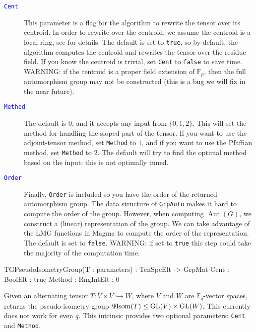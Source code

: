 \documentclass{documentation}
\DeclareMathOperator{\Aut}{Aut}
\DeclareMathOperator{\isom}{Isom}
\DeclareMathOperator{\GL}{{\rm GL}}
\newcommand{\pseudo}{\Psi\hspace*{-1mm}\isom}
\begin{document}
\begin{description}
\item[\textcolor{blue}{\tt Cent}]
This parameter is a flag for the algorithm to rewrite the tensor over its centroid. 
In order to rewrite over the centroid, we assume the centroid is a local ring, see \cite{eMAGma} for details.
The default is set to {\tt true}, so by default, the algorithm computes the centroid and rewrites the tensor over the residue field.
If you know the centroid is trivial, set {\tt Cent} to {\tt false} to save time.
WARNING: if the centroid is a proper field extension of $\mathbb{F}_p$, then the full automorphism group may not be constructed (this is a bug we will fix in the near future).
\item[\textcolor{blue}{\tt Method}]
The default is $0$, and it accepts any input from $\{ 0,1,2\}$. 
This will set the method for handling the sloped part of the tensor.
If you want to use the adjoint-tensor method, set {\tt Method} to $1$, and if you want to use the Pfaffian method, set {\tt Method} to $2$. The default will try to find the optimal method based on the input; this is not optimally tuned.
\item[\textcolor{blue}{\tt Order}]
Finally, {\tt Order} is included so you have the order of the returned automorphism group. 
The data structure of {\tt GrpAuto} makes it hard to compute the order of the group. 
However, when computing $\Aut(G)$, we construct a (linear) representation of the group. 
We can take advantage of the LMG functions \cite{LMG} in Magma to compute the order of the representation. 
The default is set to {\tt false}. 
WARNING: if set to {\tt true} this step could take the majority of the computation time.
\end{description}

\begin{intrinsics}
TGPseudoIsometryGroup(T : parameters) : TenSpcElt -> GrpMat
    Cent : BoolElt : true
    Method : RngIntElt : 0
\end{intrinsics}

Given an alternating tensor $T : V \times V \rightarrowtail W$, where $V$ and $W$ are $\mathbb{F}_q$-vector spaces, returns the pseudo-isometry group $\pseudo(T)\leq \GL(V)\times \GL(W)$.
This currently does not work for even $q$. 
This intrinsic provides two optional parameters: {\tt Cent} and {\tt Method}. 
\end{document}
